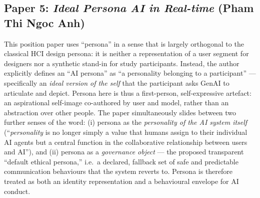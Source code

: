 \subsection*{Paper 5: \textit{Ideal Persona AI in Real-time} (Pham Thi Ngoc Anh)}


This position paper uses ``persona'' in a sense that is largely orthogonal to the classical HCI design persona: it is neither a representation of a user segment for designers nor a synthetic stand-in for study participants. Instead, the author explicitly defines an ``AI persona'' as ``a personality belonging to a participant'' --- specifically an \emph{ideal version of the self} that the participant asks GenAI to articulate and depict. Persona here is thus a first-person, self-expressive artefact: an aspirational self-image co-authored by user and model, rather than an abstraction over other people. The paper simultaneously slides between two further senses of the word: (i) persona as the \emph{personality of the AI system itself} (``\textit{personality} is no longer simply a value that humans assign to their individual AI agents but a central function in the collaborative relationship between users and AI''), and (ii) persona as a \emph{governance object} --- the proposed transparent ``default ethical persona,'' i.e.\ a declared, fallback set of safe and predictable communication behaviours that the system reverts to. Persona is therefore treated as both an identity representation and a behavioural envelope for AI conduct.

